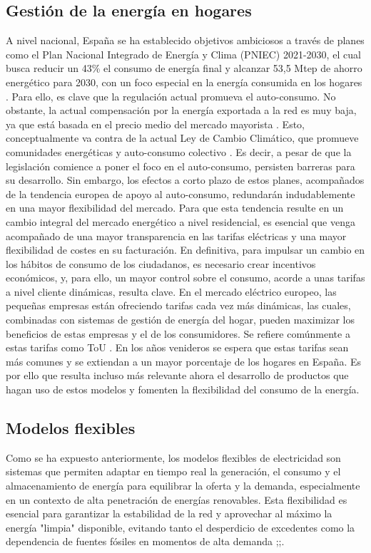 \documentclass[11pt,a4paper]{book}
\begin{document}
\subsection{Gestión de la energía en hogares}
A nivel nacional, España se ha establecido objetivos ambiciosos a través de planes como el Plan Nacional Integrado de Energía y Clima (PNIEC) 2021-2030, el cual busca reducir un 43\% el consumo de energía final y alcanzar 53,5 Mtep de ahorro energético para 2030, con un foco especial en la energía consumida en los hogares \cite{odyssee2024}. Para ello, es clave que la regulación actual promueva el auto-consumo. No obstante, la actual compensación por la energía exportada a la red es muy baja, ya que está basada en el precio medio del mercado mayorista \cite{prosumers2021}. Esto, conceptualmente va contra de la actual Ley de Cambio Climático, que promueve comunidades energéticas y auto-consumo colectivo \cite{mitma2021}. Es decir, a pesar de que la legislación comience a poner el foco en el auto-consumo, persisten barreras para su desarrollo. Sin embargo, los efectos a corto plazo de estos planes, acompañados de la tendencia europea de apoyo al auto-consumo, redundarán indudablemente en una mayor flexibilidad del mercado.
Para que esta tendencia resulte en un cambio integral del mercado energético a nivel residencial, es esencial que venga acompañado de una mayor transparencia en las tarifas eléctricas y una mayor flexibilidad de costes en su facturación. En definitiva, para impulsar un cambio en los hábitos de consumo de los ciudadanos, es necesario crear incentivos económicos, y, para ello, un mayor control sobre el consumo, acorde a unas tarifas a nivel cliente dinámicas, resulta clave. 
En el mercado eléctrico europeo, las pequeñas empresas están ofreciendo tarifas cada vez más dinámicas, las cuales, combinadas con sistemas de gestión de energía del hogar, pueden maximizar los beneficios de estas empresas y el de los consumidores. Se refiere comúnmente a estas tarifas como ToU \cite{LCP2025}. En los años venideros se espera que estas tarifas sean más comunes y se extiendan a un mayor porcentaje de los hogares en España. Es por ello que resulta incluso más relevante ahora el desarrollo de productos que hagan uso de estos modelos y fomenten la flexibilidad del consumo de la energía.
\subsection{Modelos flexibles}
Como se ha expuesto anteriormente, los modelos flexibles de electricidad son sistemas que permiten adaptar en tiempo real la generación, el consumo y el almacenamiento de energía para equilibrar la oferta y la demanda, especialmente en un contexto de alta penetración de energías renovables. Esta flexibilidad es esencial para garantizar la estabilidad de la red y aprovechar al máximo la energía "limpia" disponible, evitando tanto el desperdicio de excedentes como la dependencia de fuentes fósiles en momentos de alta demanda \cite{iberdrolaFlexibilidad2024};\cite{cuervaFlexibilidad2024};\cite{elperiodicoFlexibilidad2024}.
\end{document}
